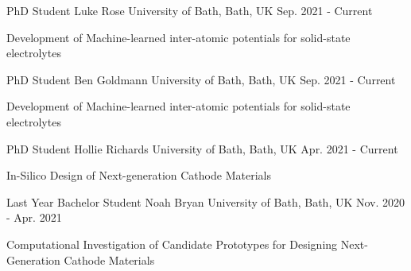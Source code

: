 
\begin{cventries}

    \cventry
    {PhD Student} %
    {Luke Rose} %
    {University of Bath, Bath, UK} %
    {Sep. 2021 - Current} %
    {
      \begin{cvitems} %
        \item {Development of Machine-learned inter-atomic potentials for solid-state electrolytes}
      \end{cvitems}
    }

    \cventry
    {PhD Student} %
    {Ben Goldmann} %
    {University of Bath, Bath, UK} %
    {Sep. 2021 - Current} %
    {
      \begin{cvitems} %
        \item {Development of Machine-learned inter-atomic potentials for solid-state electrolytes}
      \end{cvitems}
    }
    \cventry
    {PhD Student} %
    {Hollie Richards} %
    {University of Bath, Bath, UK} %
    {Apr. 2021 - Current} %
    {
      \begin{cvitems} %
        \item {In-Silico Design of Next-generation Cathode Materials}
      \end{cvitems}
    }
    
    \cventry
    {Last Year Bachelor Student} %
    {Noah Bryan} %
    {University of Bath, Bath, UK} %
    {Nov. 2020 - Apr. 2021} %
    {
      \begin{cvitems} %
        \item {Computational Investigation of Candidate Prototypes for Designing Next-Generation Cathode Materials}
      \end{cvitems}
    }
    

\end{cventries}
